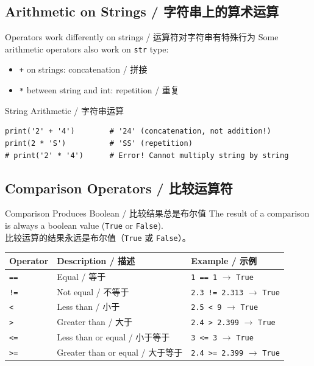 \documentclass[11pt,a4paper]{article}
\begin{document}
\subsection{Arithmetic on Strings / 字符串上的算术运算}

\begin{concept}{Operators work differently on strings / 运算符对字符串有特殊行为}
    Some arithmetic operators also work on \texttt{str} type:
    \begin{itemize}
        \item \texttt{+} on strings: concatenation / 拼接
        \item \texttt{*} between string and int: repetition / 重复
    \end{itemize}
\end{concept}

\begin{examplebox}{String Arithmetic / 字符串运算}
\begin{lstlisting}
print('2' + '4')        # '24' (concatenation, not addition!)
print(2 * 'S')          # 'SS' (repetition)
# print('2' * '4')      # Error! Cannot multiply string by string
\end{lstlisting}
\end{examplebox}

\subsection{Comparison Operators / 比较运算符}

\begin{concept}{Comparison Produces Boolean / 比较结果总是布尔值}
    The result of a comparison is always a boolean value (\texttt{True} or \texttt{False}). \\
    比较运算的结果永远是布尔值（\texttt{True} 或 \texttt{False}）。
\end{concept}

\begin{table}[h]
\centering
\renewcommand{\arraystretch}{1.5}
\begin{tabular}{@{}lll@{}}
\toprule
\textbf{Operator} & \textbf{Description / 描述} & \textbf{Example / 示例} \\ \midrule
\texttt{==} & Equal / 等于               & \texttt{1 == 1} $\rightarrow$ \texttt{True} \\
\texttt{!=} & Not equal / 不等于          & \texttt{2.3 != 2.313} $\rightarrow$ \texttt{True} \\
\texttt{<}  & Less than / 小于             & \texttt{2.5 < 9} $\rightarrow$ \texttt{True} \\
\texttt{>}  & Greater than / 大于          & \texttt{2.4 > 2.399} $\rightarrow$ \texttt{True} \\
\texttt{<=} & Less than or equal / 小于等于  & \texttt{3 <= 3} $\rightarrow$ \texttt{True} \\
\texttt{>=} & Greater than or equal / 大于等于 & \texttt{2.4 >= 2.399} $\rightarrow$ \texttt{True} \\ \bottomrule
\end{tabular}
\end{table}
\end{document}
